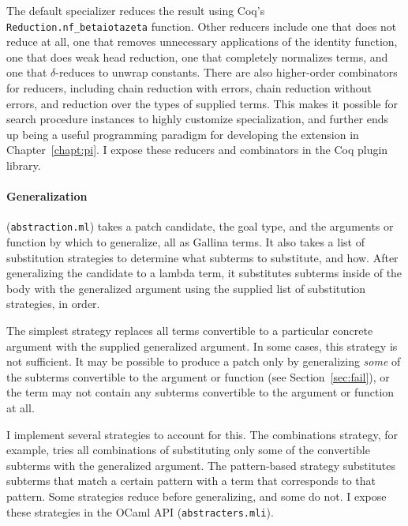 The default specializer reduces the result using Coq's
\lstinline{Reduction.nf_betaiotazeta} function.
Other reducers include one that does not reduce at all, one that removes unnecessary applications of the identity function, 
one that does weak head reduction, one that completely normalizes terms, %
and one that $\delta$-reduces to unwrap constants.
There are also higher-order combinators for reducers,
including chain reduction with errors, chain reduction without errors, and reduction over the types of supplied terms.
This makes it possible for search procedure instances to highly customize specialization,
and further ends up being a useful programming paradigm for developing the \toolnamec extension in Chapter~\ref{chapt:pi}.
I expose these reducers and combinators in the Coq plugin library. %

\paragraph{Generalization}  (\lstinline{abstraction.ml}) %
takes a patch candidate, the goal type, and the arguments or function by which to generalize,
all as Gallina terms.
It also takes a list of substitution strategies to determine what subterms to substitute, and how.
After generalizing the candidate to a lambda term, it substitutes subterms inside of the body with the generalized argument
using the supplied list of substitution strategies, in order.

The simplest strategy replaces all terms convertible to a particular concrete argument %
with the supplied generalized argument.
In some cases, this strategy is not sufficient.
It may be possible to produce a patch only by generalizing \emph{some} of the subterms
convertible to the argument or function (see Section~\ref{sec:fail}),
or the term may not contain any subterms convertible to the argument or function at all.

I implement several strategies to account for this. The combinations strategy, for example,
tries all combinations of substituting only some of the convertible subterms with the generalized argument. 
The pattern-based strategy substitutes subterms that match a certain pattern
with a term that corresponds to that pattern.
Some strategies reduce before generalizing, and some do not.
I expose these strategies in the \sysname OCaml API (\lstinline{abstracters.mli}). %

